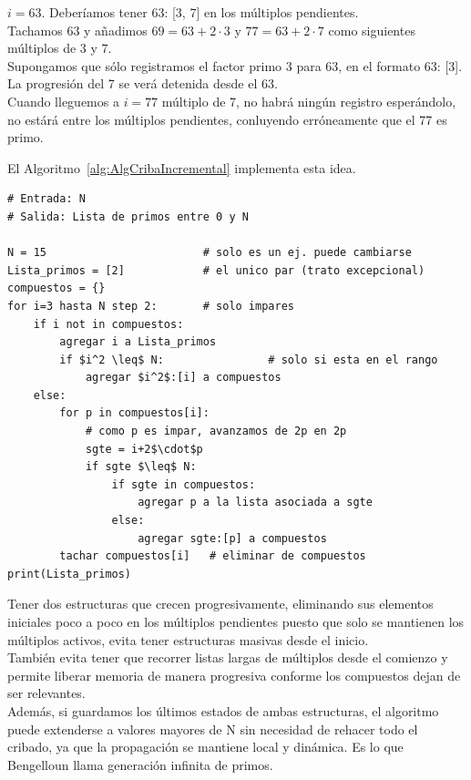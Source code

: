 \begin{ejemplo}
$i =63$. Deberíamos tener 63: [3, 7] en los múltiplos pendientes. \\
Tachamos $63$ y añadimos $ 69 = 63+2\cdot 3$ y $77 = 63+2\cdot 7$ como siguientes múltiplos de $3$ y $7$. \\
Supongamos que sólo registramos el factor primo $3$ para $63$, en el formato 63: [3]. \\
La progresión del 7 se verá detenida desde el 63. \\
Cuando lleguemos a $i=77$ múltiplo de 7, no habrá ningún registro esperándolo, no estárá entre los múltiplos pendientes, conluyendo erróneamente que el 77 es primo. \\
\end{ejemplo}

El Algoritmo~\ref{alg:AlgCribaIncremental} implementa esta idea.

\begin{lstlisting}[caption={Criba incremental con impares}, label={alg:AlgCribaIncremental}, mathescape=true]
# Entrada: N
# Salida: Lista de primos entre 0 y N 

N = 15                        # solo es un ej. puede cambiarse 
Lista_primos = [2]            # el unico par (trato excepcional)
compuestos = {}
for i=3 hasta N step 2:       # solo impares
    if i not in compuestos:
        agregar i a Lista_primos
        if $i^2 \leq$ N:                # solo si esta en el rango
            agregar $i^2$:[i] a compuestos
    else:
        for p in compuestos[i]:
            # como p es impar, avanzamos de 2p en 2p
            sgte = i+2$\cdot$p
            if sgte $\leq$ N: 
                if sgte in compuestos:
                    agregar p a la lista asociada a sgte
                else: 
                    agregar sgte:[p] a compuestos
        tachar compuestos[i]   # eliminar de compuestos
print(Lista_primos)
\end{lstlisting}

Tener dos estructuras que crecen progresivamente, eliminando sus elementos iniciales poco a poco en los múltiplos pendientes puesto que solo se mantienen los múltiplos activos, evita tener estructuras masivas desde el inicio. \\
También evita tener que recorrer listas largas de múltiplos desde el comienzo y permite liberar memoria de manera progresiva conforme los compuestos dejan de ser relevantes. \\
Además, si guardamos los últimos estados de ambas estructuras, el algoritmo puede extenderse a valores mayores de N sin necesidad de rehacer todo el cribado, ya que la propagación se mantiene local y dinámica. Es lo que Bengelloun \cite{ DBLP:journals/acta/Bengelloun86} llama generación infinita de primos.


